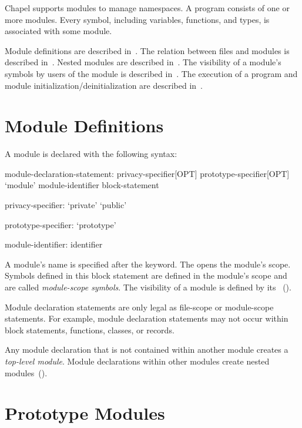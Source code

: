 \label{Modules}

Chapel supports modules to manage namespaces.  A program consists of
one or more modules.  Every symbol, including variables, functions,
and types, is associated with some module.

Module definitions are described in~.  The
relation between files and modules is described
in~.  Nested modules are described
in~.  The visibility of a module's symbols by
users of the module is described in~.  The execution
of a program and module initialization/deinitialization are described
in~.

\section{Module Definitions}
\label{Module_Definitions}

A module is declared with the following syntax:
\begin{syntax}
module-declaration-statement:
  privacy-specifier[OPT] prototype-specifier[OPT] `module' module-identifier block-statement

privacy-specifier:
  `private'
  `public'

prototype-specifier:
  `prototype'

module-identifier:
  identifier
\end{syntax}

A module's name is specified after the  keyword.
The  opens the module's scope.  Symbols defined
in this block statement are defined in the module's scope and are
called \emph{module-scope symbols}.  The visibility of a module is
defined by its ~().

Module declaration statements are only legal as file-scope or
module-scope statements.  For example, module declaration statements
may not occur within block statements, functions, classes, or records.

Any module declaration that is not contained within another module
creates a \emph{top-level module}.  Module declarations within other
modules create nested modules~().

\section{Prototype Modules}
\label{Prototype_Modules}


